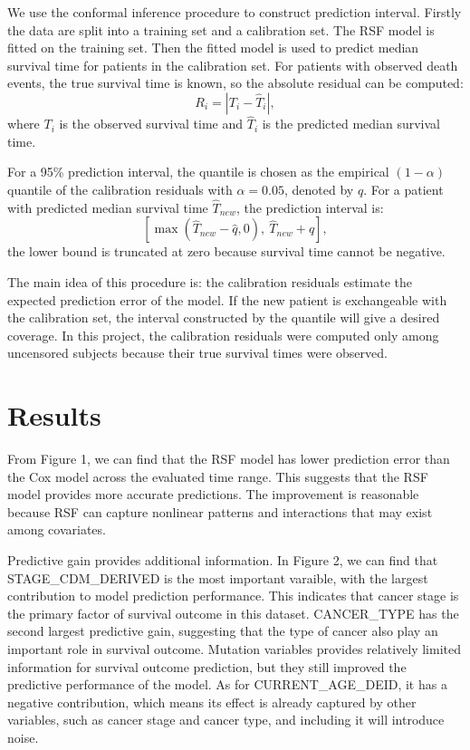 \documentclass[11pt]{article}
\begin{document}
We use the conformal inference procedure to construct prediction interval. Firstly the data are split into a training set and a calibration set. The RSF model is fitted on the training set. Then the fitted model is used to predict median survival time for patients in the calibration set. For patients with observed death events, the true survival time is known, so the absolute residual can be computed:
\[
R_i = |T_i - \hat{T}_i|,
\]
where $T_i$ is the observed survival time and $\hat{T}_i$ is the predicted median survival time.

For a 95\% prediction interval, the quantile is chosen as the empirical $(1-\alpha)$ quantile of the calibration residuals with $\alpha=0.05$, denoted by $\hat{q}$. For a patient with predicted median survival time $\hat{T}_{new}$, the prediction interval is:
\[
[\max(\hat{T}_{new}-\hat{q},0),\ \hat{T}_{new}+\hat{q}],
\]
the lower bound is truncated at zero because survival time cannot be negative.

The main idea of this procedure is: the calibration residuals estimate the expected prediction error of the model. If the new patient is exchangeable with the calibration set, the interval constructed by the quantile will give a desired coverage. In this project, the calibration residuals were computed only among uncensored subjects because their true survival times were observed.

\section{Results}

From Figure 1, we can find that the RSF model has lower prediction error than the Cox model across the evaluated time range. This suggests that the RSF model provides more accurate predictions. The improvement is reasonable because RSF can capture nonlinear patterns and interactions that may exist among covariates.


Predictive gain provides additional information. In Figure 2, 
we can find that STAGE\_CDM\_DERIVED is the most important varaible, with the largest contribution to model prediction performance. This indicates that cancer stage is the primary factor of survival outcome in this dataset. CANCER\_TYPE has the second largest predictive gain, suggesting that the type of cancer also play an important role in survival outcome. Mutation variables provides relatively limited information for survival outcome prediction, but they still improved the predictive performance of the model. As for CURRENT\_AGE\_DEID, it has a negative contribution, which means its effect is already captured by other variables, such as cancer stage and cancer type, and including it will introduce noise.
\end{document}
